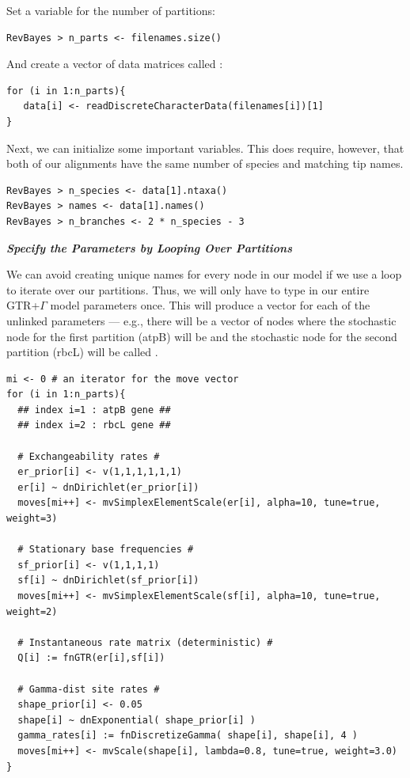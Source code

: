 Set a variable for the number of partitions:
{\tt \begin{snugshade*}
\begin{lstlisting}
RevBayes > n_parts <- filenames.size()
\end{lstlisting}
\end{snugshade*}}

And create a vector of data matrices called :
{\tt \begin{snugshade*}
\begin{lstlisting}
for (i in 1:n_parts){
   data[i] <- readDiscreteCharacterData(filenames[i])[1]
}
\end{lstlisting}
\end{snugshade*}}

Next, we can initialize some important variables. This does require, however, that both of our alignments have the same number of species and matching tip names.
{\tt \begin{snugshade*}
\begin{lstlisting}
RevBayes > n_species <- data[1].ntaxa()
RevBayes > names <- data[1].names()
RevBayes > n_branches <- 2 * n_species - 3
\end{lstlisting}
\end{snugshade*}}


\textbf{\textit{Specify the Parameters by Looping Over Partitions}}

We can avoid creating unique names for every node in our model if we use a  loop to iterate over our partitions. Thus, we will only have to type in our entire GTR+$\Gamma$ model parameters once. 
This will produce a vector for each of the unlinked parameters --- e.g., there will be a vector of  nodes where the stochastic node for the first partition (atpB) will be  and the stochastic node for the second partition (rbcL) will be called .
{\tt \small \begin{snugshade*}
\begin{lstlisting}
mi <- 0 # an iterator for the move vector
for (i in 1:n_parts){
  ## index i=1 : atpB gene ##
  ## index i=2 : rbcL gene ##
  
  # Exchangeability rates #
  er_prior[i] <- v(1,1,1,1,1,1)
  er[i] ~ dnDirichlet(er_prior[i])
  moves[mi++] <- mvSimplexElementScale(er[i], alpha=10, tune=true, weight=3) 

  # Stationary base frequencies #
  sf_prior[i] <- v(1,1,1,1)
  sf[i] ~ dnDirichlet(sf_prior[i])
  moves[mi++] <- mvSimplexElementScale(sf[i], alpha=10, tune=true, weight=2) 

  # Instantaneous rate matrix (deterministic) #
  Q[i] := fnGTR(er[i],sf[i]) 

  # Gamma-dist site rates #
  shape_prior[i] <- 0.05 
  shape[i] ~ dnExponential( shape_prior[i] )
  gamma_rates[i] := fnDiscretizeGamma( shape[i], shape[i], 4 )
  moves[mi++] <- mvScale(shape[i], lambda=0.8, tune=true, weight=3.0)
}
\end{lstlisting}
\end{snugshade*}}


